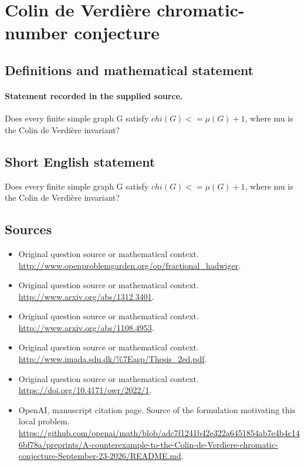 \documentclass[11pt]{article}
\begin{document}
\section*{Colin de Verdière chromatic-number conjecture}\label{statement}
\subsection{Definitions and mathematical statement}
\paragraph{Statement recorded in the supplied source.}
Does every finite simple graph G satisfy $chi(G)<=\mu (G)+1$, where mu is the Colin de Verdière invariant?
\subsection{Short English statement}
Does every finite simple graph G satisfy $chi(G)<=\mu (G)+1$, where mu is the Colin de Verdière invariant?
\subsection{Sources}
\begin{itemize}
\item[S1] Original question source or mathematical context.
\url{http://www.openproblemgarden.org/op/fractional_hadwiger}.
\item[S2] Original question source or mathematical context.
\url{http://www.arxiv.org/abs/1312.3401}.
\item[S3] Original question source or mathematical context.
\url{http://www.arxiv.org/abs/1108.4953}.
\item[S4] Original question source or mathematical context.
\url{http://www.imada.sdu.dk/%7Easp/Thesis_2ed.pdf}.
\item[S5] Original question source or mathematical context.
\url{https://doi.org/10.4171/owr/2022/1}.
\item[S6] OpenAI, manuscript citation page. Source of the formulation motivating this local problem.
\url{https://github.com/openai/math/blob/adc7f1241b42e322a6451854ab7e4b4c146bf78a/preprints/A-counterexample-to-the-Colin-de-Verdiere-chromatic-conjecture-September-23-2026/README.md}.
\end{itemize}
\end{document}
